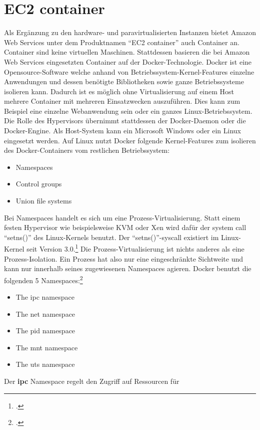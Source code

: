 \documentclass[titlepage]{report}
\begin{document}
\section*{EC2 container}
Als Ergänzung zu den hardware\hyp{} und paravirtualisierten Instanzen
bietet Amazon Web Services unter dem Produktnamen ``EC2 container'' auch
Container an. Container sind keine virtuellen Maschinen. Stattdessen
basieren die bei Amazon Web Services eingesetzten Container auf der
Docker\hyp{}Technologie. Docker ist eine Opensource\hyp{}Software welche
anhand von Betriebssystem\hyp{}Kernel\hyp{}Features einzelne Anwendungen
und dessen benötigte Bibliotheken sowie ganze Betriebssysteme isolieren
kann. Dadurch ist es möglich ohne Virtualisierung auf einem Host mehrere
Container mit mehreren Einsatzwecken auszuführen. Dies kann zum Beispiel
eine einzelne Webanwendung sein oder ein ganzes Linux-Betriebssystem.
Die Rolle des Hypervisors übernimmt stattdessen der Docker\hyp{}Daemon oder
die Docker\hyp{}Engine. Als Host\hyp{}System kann ein Microsoft Windows
oder ein Linux eingesetzt werden. Auf Linux nutzt Docker folgende
Kernel\hyp{}Features zum isolieren des Docker\hyp{}Containers vom
restlichen Betriebssystem:
\begin{itemize}
    \item Namespaces
    \item Control groups
    \item Union file systems
\end{itemize}
Bei Namespaces handelt es sich um eine Prozess\hyp{}Virtualisierung.
Statt einem festen Hypervisor wie beispielsweise KVM oder Xen wird dafür
der system call ``setns()'' des Linux\hyp{}Kernels benutzt. Der
``setns()''\hyp{}syscall existiert im Linux\hyp{}Kernel seit Version
3.0.\footcite{setns} Die Prozess\hyp{}Virtualisierung ist nichts anderes als
eine Prozess\hyp{}Isolation. Ein Prozess hat also nur eine eingeschränkte
Sichtweite und kann nur innerhalb seines zugewiesenen Namespaces
agieren. Docker benutzt die folgenden 5 Namespaces:\footcite{docker}
\begin{itemize}
    \item The ipc namespace
    \item The net namespace
    \item The pid namespace
    \item The mnt namespace
    \item The uts namespace
\end{itemize}
Der \textbf{ipc} Namespace regelt den Zugriff auf Ressourcen für
\end{document}
